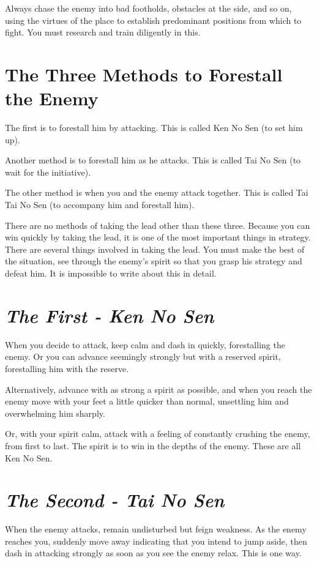 \documentclass[12pt]{report}
\begin{document}
Always chase the enemy into bad footholds, obstacles at the side, and so on, using the virtues of the place to establish predominant positions from which to fight. You must research and train diligently in this.
\section*{The Three Methods to Forestall the Enemy}

The first is to forestall him by attacking. This is called Ken No Sen (to set him up).

Another method is to forestall him as he attacks. This is called Tai No Sen (to wait for the initiative).

The other method is when you and the enemy attack together. This is called Tai Tai No Sen (to accompany him and forestall him).

There are no methods of taking the lead other than these three. Because you can win quickly by taking the lead, it is one of the most important things in strategy. There are several things involved in taking the lead. You must make the best of the situation, see through the enemy's spirit so that you grasp his strategy and defeat him. It is impossible to write about this in detail.
\section*{\emph{The First - Ken No Sen}}
When you decide to attack, keep calm and dash in quickly, forestalling the enemy. Or you can advance seemingly strongly but with a reserved spirit, forestalling him with the reserve.

Alternatively, advance with as strong a spirit as possible, and when you reach the enemy move with your feet a little quicker than normal, unsettling him and overwhelming him sharply.

Or, with your spirit calm, attack with a feeling of constantly crushing the enemy, from first to last. The spirit is to win in the depths of the enemy. These are all Ken No Sen.
\section*{\emph{The Second - Tai No Sen}}

When the enemy attacks, remain undisturbed but feign weakness. As the enemy reaches you, suddenly move away indicating that you intend to jump aside, then dash in attacking strongly as soon as you see the enemy relax. This is one way.
\end{document}
